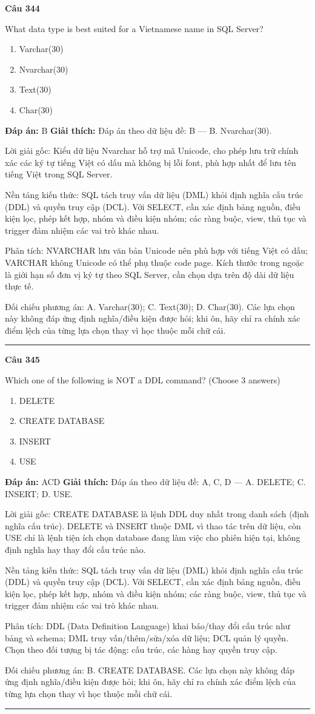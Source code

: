 \documentclass[11pt,a4paper]{article}
\newenvironment{question}[1]{%
  \par\vspace{1em}\noindent\textbf{\large Câu #1}\par\vspace{0.4em}
}{%
  \par\vspace{1em}\hrule\vspace{0.6em}
}
\newenvironment{choices}{%
  \begin{enumerate}[label=\textbf{\Alph*.},leftmargin=2.2em,itemsep=2pt,topsep=3pt]
}{%
  \end{enumerate}
}
\newcommand{\choice}{\item}
\begin{document}
\begin{question}{344}
What data type is best suited for a Vietnamese name in SQL Server?
\begin{choices}
\choice Varchar(30)
\choice Nvarchar(30)
\choice Text(30)
\choice Char(30)
\end{choices}
\textbf{Đáp án:} B
\textbf{Giải thích:} Đáp án theo dữ liệu đề: B — B. Nvarchar(30).

Lời giải gốc: Kiểu dữ liệu Nvarchar hỗ trợ mã Unicode, cho phép lưu trữ chính xác các ký tự tiếng Việt có dấu mà không bị lỗi font, phù hợp nhất để lưu tên tiếng Việt trong SQL Server.

Nền tảng kiến thức: SQL tách truy vấn dữ liệu (DML) khỏi định nghĩa cấu trúc (DDL) và quyền truy cập (DCL). Với SELECT, cần xác định bảng nguồn, điều kiện lọc, phép kết hợp, nhóm và điều kiện nhóm; các ràng buộc, view, thủ tục và trigger đảm nhiệm các vai trò khác nhau.

Phân tích: NVARCHAR lưu văn bản Unicode nên phù hợp với tiếng Việt có dấu; VARCHAR không Unicode có thể phụ thuộc code page. Kích thước trong ngoặc là giới hạn số đơn vị ký tự theo SQL Server, cần chọn dựa trên độ dài dữ liệu thực tế.

Đối chiếu phương án: A. Varchar(30); C. Text(30); D. Char(30). Các lựa chọn này không đáp ứng định nghĩa/điều kiện được hỏi; khi ôn, hãy chỉ ra chính xác điểm lệch của từng lựa chọn thay vì học thuộc mỗi chữ cái.
\end{question}

\begin{question}{345}
Which one of the following is NOT a DDL command? (Choose 3 answers)
\begin{choices}
\choice DELETE
\choice CREATE DATABASE
\choice INSERT
\choice USE
\end{choices}
\textbf{Đáp án:} ACD
\textbf{Giải thích:} Đáp án theo dữ liệu đề: A, C, D — A. DELETE; C. INSERT; D. USE.

Lời giải gốc: CREATE DATABASE là lệnh DDL duy nhất trong danh sách (định nghĩa cấu trúc). DELETE và INSERT thuộc DML vì thao tác trên dữ liệu, còn USE chỉ là lệnh tiện ích chọn database đang làm việc cho phiên hiện tại, không định nghĩa hay thay đổi cấu trúc nào.

Nền tảng kiến thức: SQL tách truy vấn dữ liệu (DML) khỏi định nghĩa cấu trúc (DDL) và quyền truy cập (DCL). Với SELECT, cần xác định bảng nguồn, điều kiện lọc, phép kết hợp, nhóm và điều kiện nhóm; các ràng buộc, view, thủ tục và trigger đảm nhiệm các vai trò khác nhau.

Phân tích: DDL (Data Definition Language) khai báo/thay đổi cấu trúc như bảng và schema; DML truy vấn/thêm/sửa/xóa dữ liệu; DCL quản lý quyền. Chọn theo đối tượng bị tác động: cấu trúc, các hàng hay quyền truy cập.

Đối chiếu phương án: B. CREATE DATABASE. Các lựa chọn này không đáp ứng định nghĩa/điều kiện được hỏi; khi ôn, hãy chỉ ra chính xác điểm lệch của từng lựa chọn thay vì học thuộc mỗi chữ cái.
\end{question}
\end{document}
